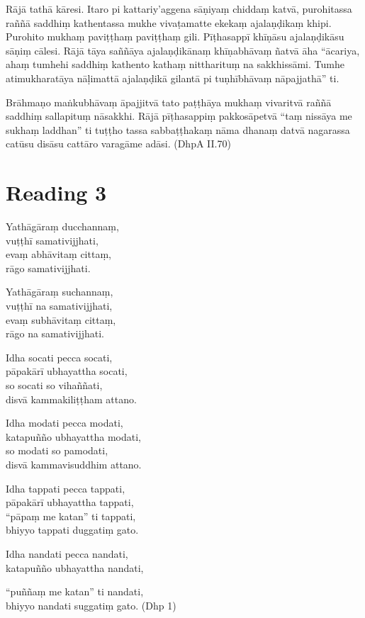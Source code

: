 Rājā tathā kāresi. Itaro pi kattariy’aggena sāṇiyaṃ chiddaṃ katvā, purohitassa raññā saddhiṃ kathentassa mukhe vivaṭamatte ekekaṃ ajalaṇḍikaṃ khipi. Purohito mukhaṃ paviṭṭhaṃ paviṭṭhaṃ gili. Pīṭhasappī khīṇāsu ajalaṇḍikāsu sāṇiṃ cālesi. Rājā tāya saññāya ajalaṇḍikānaṃ khīṇabhāvaṃ ñatvā āha “ācariya, ahaṃ tumhehi saddhiṃ kathento kathaṃ nittharituṃ na sakkhissāmi. Tumhe atimukharatāya nāḷimattā ajalaṇḍikā gilantā pi tuṇhībhāvaṃ nāpajjathā” ti.

Brāhmaṇo maṅkubhāvaṃ āpajjitvā tato paṭṭhāya mukhaṃ vivaritvā raññā saddhiṃ sallapituṃ nāsakkhi. Rājā pīṭhasappiṃ pakkosāpetvā “taṃ nissāya me sukhaṃ laddhan” ti tuṭṭho tassa sabbaṭṭhakaṃ nāma dhanaṃ datvā nagarassa catūsu disāsu cattāro varagāme adāsi. \hfill(DhpA II.70)

\section*{Reading 3}

Yathāgāraṃ ducchannaṃ,\\
vuṭṭhī samativijjhati,\\
evaṃ abhāvitaṃ cittaṃ,\\
rāgo samativijjhati.

Yathāgāraṃ suchannaṃ,\\
vuṭṭhī na samativijjhati,\\
evaṃ subhāvitaṃ cittaṃ,\\
rāgo na samativijjhati.

Idha socati pecca socati,\\
pāpakārī ubhayattha socati,\\
so socati so vihaññati,\\
disvā kammakiliṭṭham attano.

Idha modati pecca modati,\\
katapuñño ubhayattha modati,\\
so modati so pamodati,\\
disvā kammavisuddhim attano.

Idha tappati pecca tappati,\\
pāpakārī ubhayattha tappati,\\
“pāpaṃ me katan” ti tappati,\\
bhiyyo tappati duggatiṃ gato.

Idha nandati pecca nandati,\\
katapuñño ubhayattha nandati,

“puññaṃ me katan” ti nandati,\\
bhiyyo nandati suggatiṃ gato. \hfill(Dhp 1)

